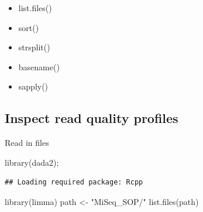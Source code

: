 \documentclass[
]{book}
\newenvironment{Shaded}{\begin{snugshade}}{\end{snugshade}}
\newcommand{\FunctionTok}[1]{\textcolor[rgb]{0.00,0.00,0.00}{#1}}
\newcommand{\NormalTok}[1]{#1}
\newcommand{\OtherTok}[1]{\textcolor[rgb]{0.56,0.35,0.01}{#1}}
\newcommand{\StringTok}[1]{\textcolor[rgb]{0.31,0.60,0.02}{#1}}
\providecommand{\tightlist}{%
  \setlength{\itemsep}{0pt}\setlength{\parskip}{0pt}}
\begin{document}
\begin{itemize}
\tightlist
\item
  list.files()
\item
  sort()
\item
  strsplit()
\item
  basename()
\item
  sapply()
\end{itemize}

\hypertarget{inspect-read-quality-profiles}{%
\subsection{Inspect read quality profiles}\label{inspect-read-quality-profiles}}

Read in files

\begin{Shaded}
\begin{Highlighting}[]
\FunctionTok{library}\NormalTok{(dada2);}
\end{Highlighting}
\end{Shaded}

\begin{verbatim}
## Loading required package: Rcpp
\end{verbatim}

\begin{Shaded}
\begin{Highlighting}[]
\FunctionTok{library}\NormalTok{(limma)}
\NormalTok{path }\OtherTok{\textless{}{-}} \StringTok{"MiSeq\_SOP/"}
\FunctionTok{list.files}\NormalTok{(path)}
\end{Highlighting}
\end{Shaded}
\end{document}
